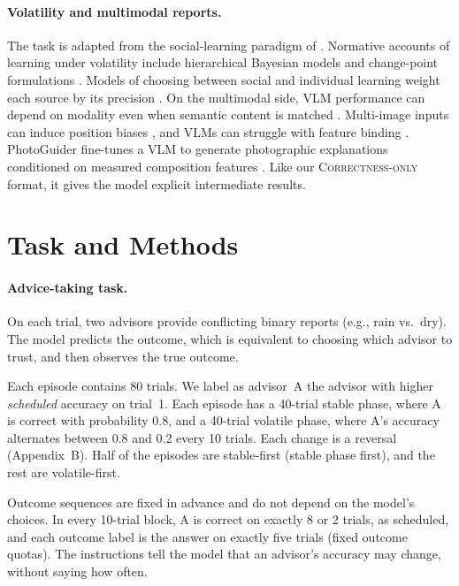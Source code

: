 \documentclass[letterpaper]{article} %
\newcommand{\CorrectnessOnly}{\textsc{Correctness-only}}
\begin{document}
\paragraph{Volatility and multimodal reports.} The task is adapted from the social-learning paradigm of \citet{behrens2008associative}. Normative accounts of learning under volatility include hierarchical Bayesian models and change-point formulations \citep{behrens2007learning,nassar2010approximately,nassar2012rational,mathys2011bayesian,piray2021model,piray2024computational,soltani2019adaptive}. Models of choosing between social and individual learning weight each source by its precision \citep{diaconescu2020neural}. On the multimodal side, VLM performance can depend on modality even when semantic content is matched \citep{fu2024isobench}. Multi-image inputs can induce position biases \citep{tian2025position}, and VLMs can struggle with feature binding \citep{campbell2024binding}. PhotoGuider fine-tunes a VLM to generate photographic explanations conditioned on measured composition features \citep{lee2026photoguider}. Like our \CorrectnessOnly{} format, it gives the model explicit intermediate results.

\section{Task and Methods}
\paragraph{Advice-taking task.} On each trial, two advisors provide conflicting binary reports (e.g., rain vs.\ dry). The model predicts the outcome, which is equivalent to choosing which advisor to trust, and then observes the true outcome.

Each episode contains 80 trials. We label as advisor~A the advisor with higher \emph{scheduled} accuracy on trial~1. Each episode has a 40-trial stable phase, where A is correct with probability 0.8, and a 40-trial volatile phase, where A's accuracy alternates between 0.8 and 0.2 every 10 trials. Each change is a reversal \citep{behrens2008associative} (Appendix~B). Half of the episodes are stable-first (stable phase first), and the rest are volatile-first.

Outcome sequences are fixed in advance and do not depend on the model's choices. In every 10-trial block, A is correct on exactly 8 or 2 trials, as scheduled, and each outcome label is the answer on exactly five trials (fixed outcome quotas). The instructions tell the model that an advisor's accuracy may change, without saying how often.
\end{document}
